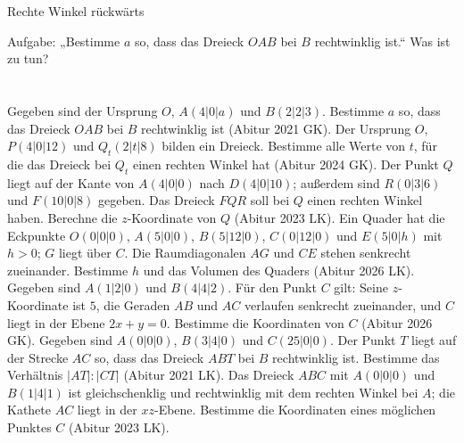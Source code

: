 \setcounter{aufgabe}{13}

\begin{aufgabe}{Rechte Winkel rückwärts}
\begin{teile}
\teil Aufgabe: „Bestimme $a$ so, dass das Dreieck $OAB$ bei $B$ rechtwinklig ist.“ Was ist zu tun? \\  \\  \\ 
\teil Gegeben sind der Ursprung $O$, $A(4 | 0 | a)$ und $B(2 | 2 | 3)$. Bestimme $a$ so, dass das Dreieck $OAB$ bei $B$ rechtwinklig ist \hfill (Abitur 2021 GK).
\teil Der Ursprung $O$, $P(4 | 0 | 12)$ und $Q_t(2 | t | 8)$ bilden ein Dreieck. Bestimme alle Werte von $t$, für die das Dreieck bei $Q_t$ einen rechten Winkel hat \hfill (Abitur 2024 GK).
\teil Der Punkt $Q$ liegt auf der Kante von $A(4 | 0 | 0)$ nach $D(4 | 0 | 10)$; außerdem sind $R(0 | 3 | 6)$ und $F(10 | 0 | 8)$ gegeben. Das Dreieck $FQR$ soll bei $Q$ einen rechten Winkel haben. Berechne die $z$-Koordinate von $Q$ \hfill (Abitur 2023 LK).
\teil Ein Quader hat die Eckpunkte $O(0 | 0 | 0)$, $A(5 | 0 | 0)$, $B(5 | 12 | 0)$, $C(0 | 12 | 0)$ und $E(5 | 0 | h)$ mit $h > 0$; $G$ liegt über $C$. Die Raumdiagonalen $AG$ und $CE$ stehen senkrecht zueinander. Bestimme $h$ und das Volumen des Quaders \hfill (Abitur 2026 LK).
\teil Gegeben sind $A(1 | 2 | 0)$ und $B(4 | 4 | 2)$. Für den Punkt $C$ gilt: Seine $z$-Koordinate ist $5$, die Geraden $AB$ und $AC$ verlaufen senkrecht zueinander, und $C$ liegt in der Ebene $2x + y = 0$. Bestimme die Koordinaten von $C$ \hfill (Abitur 2026 GK).
\teil Gegeben sind $A(0 | 0 | 0)$, $B(3 | 4 | 0)$ und $C(25 | 0 | 0)$. Der Punkt $T$ liegt auf der Strecke $AC$ so, dass das Dreieck $ABT$ bei $B$ rechtwinklig ist. Bestimme das Verhältnis $|AT| : |CT|$ \hfill (Abitur 2021 LK).
\teil Das Dreieck $ABC$ mit $A(0 | 0 | 0)$ und $B(1 | 4 | 1)$ ist gleichschenklig und rechtwinklig mit dem rechten Winkel bei $A$; die Kathete $AC$ liegt in der $xz$-Ebene. Bestimme die Koordinaten eines möglichen Punktes $C$ \hfill (Abitur 2023 LK).
\end{teile}
\end{aufgabe}


